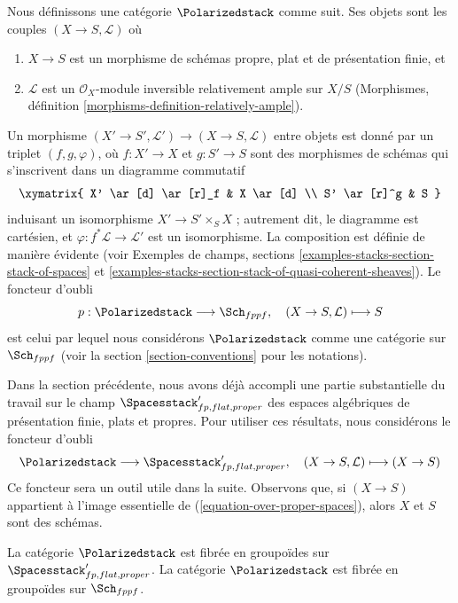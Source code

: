 \begin{situation}
\label{situation-polarized}
Nous définissons une catégorie $\Polarizedstack$ comme suit. Ses objets sont
les couples $(X \to S, \mathcal{L})$ où
\begin{enumerate}
\item $X \to S$ est un morphisme de schémas propre, plat et de présentation
finie, et
\item $\mathcal{L}$ est un $\mathcal{O}_X$-module inversible relativement
ample sur $X/S$
(Morphismes, définition \ref{morphisms-definition-relatively-ample}).
\end{enumerate}
Un morphisme $(X' \to S', \mathcal{L}') \to (X \to S, \mathcal{L})$
entre objets est donné par un triplet $(f, g, \varphi)$, où
$f : X' \to X$ et $g : S' \to S$ sont des morphismes de schémas qui
s'inscrivent dans un diagramme commutatif
$$
\xymatrix{
X' \ar[d] \ar[r]_f & X \ar[d] \\
S' \ar[r]^g & S
}
$$
induisant un isomorphisme $X' \to S' \times_S X$ ; autrement dit, le
diagramme est cartésien, et
$\varphi : f^*\mathcal{L} \to \mathcal{L}'$ est un isomorphisme.
La composition est définie de manière évidente (voir
Exemples de champs, sections
\ref{examples-stacks-section-stack-of-spaces} et
\ref{examples-stacks-section-stack-of-quasi-coherent-sheaves}).
Le foncteur d'oubli
$$
p : \Polarizedstack \longrightarrow \Sch_{fppf},\quad
(X \to S, \mathcal{L}) \longmapsto S
$$
est celui par lequel nous considérons $\Polarizedstack$ comme une catégorie
sur $\Sch_{fppf}$
(voir la section \ref{section-conventions} pour les notations).
\end{situation}

\noindent
Dans la section précédente, nous avons déjà accompli une partie substantielle
du travail sur le champ $\Spacesstack'_{fp, flat, proper}$ des espaces
algébriques de présentation finie, plats et propres. Pour utiliser ces
résultats, nous considérons le foncteur d'oubli
\begin{equation}
\label{equation-over-proper-spaces}
\Polarizedstack \longrightarrow
\Spacesstack'_{fp, flat, proper},\quad
(X \to S, \mathcal{L}) \longmapsto (X \to S)
\end{equation}
Ce foncteur sera un outil utile dans la suite.
Observons que, si $(X \to S)$ appartient à l'image essentielle de
(\ref{equation-over-proper-spaces}), alors $X$ et $S$ sont des schémas.

\begin{lemma}
\label{lemma-polarized-fibred-in-groupoids}
La catégorie $\Polarizedstack$ est fibrée en groupoïdes sur
$\Spacesstack'_{fp, flat, proper}$.
La catégorie $\Polarizedstack$ est fibrée en groupoïdes sur $\Sch_{fppf}$.
\end{lemma}

